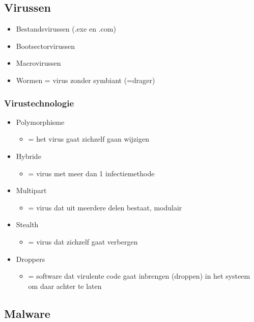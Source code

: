 \documentclass{article}
\begin{document}
\subsection{Virussen}

\begin{itemize}
    \item Bestandsvirussen (.exe en .com)
    \item Bootsectorvirussen
    \item Macrovirussen
    \item Wormen = virus zonder symbiant (=drager)
\end{itemize}

\subsubsection{Virustechnologie}

\begin{itemize}
    \item Polymorphisme
    \begin{itemize}
        \item = het virus gaat zichzelf gaan wijzigen
    \end{itemize}
    \item Hybride
    \begin{itemize}
        \item = virus met meer dan 1 infectiemethode
    \end{itemize}
    \item Multipart
    \begin{itemize}
        \item = virus dat uit meerdere delen bestaat, modulair
    \end{itemize}
    \item Stealth
    \begin{itemize}
        \item = virus dat zichzelf gaat verbergen
    \end{itemize}
    \item Droppers
    \begin{itemize}
        \item = software dat virulente code gaat inbrengen (droppen) in het systeem om daar achter te laten
    \end{itemize}
\end{itemize}

\subsection{Malware}
\end{document}
